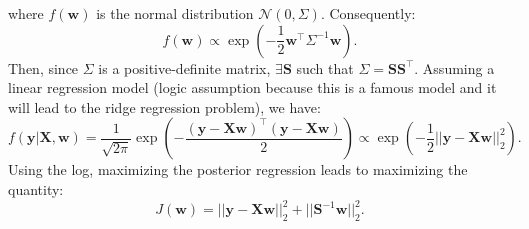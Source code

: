  where $f(\mathbf{w})$ is the normal distribution $\mathcal{N}(0, \Sigma)$. Consequently:
 \[
    f(\mathbf{w}) \propto \exp(-\frac{1}{2}\mathbf{w}^{\top} \Sigma^{-1} \mathbf{w}).
 \]
Then, since $\Sigma$ is a positive-definite matrix, $\exists \mathbf{S} $ such that $\Sigma = \mathbf{S} \mathbf{S}^{\top}$.
Assuming a linear regression model (logic assumption because this is a famous model and it will lead to the ridge regression problem), we have:
\[
f(\mathbf{y} | \mathbf{X}, \mathbf{w}) = \frac{1}{\sqrt{2\pi}} \exp\left(-\frac{(\mathbf{y} - \mathbf{X}\mathbf{w})^{\top} (\mathbf{y} - \mathbf{X}\mathbf{w})}{2}\right) \propto \exp(-\frac{1}{2} ||\mathbf{y} - \mathbf{X}\mathbf{w}||_2^2).\]
Using the log, maximizing the posterior regression leads to maximizing the quantity:
\[\boxed{
    J(\mathbf{w}) = ||\mathbf{y} - \mathbf{X}\mathbf{w}||_2^2 + ||\mathbf{S}^{-1} \mathbf{w}||_2^2.}
\]





